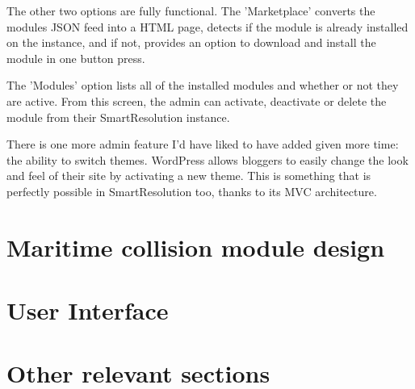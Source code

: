 The other two options are fully functional. The 'Marketplace' converts the modules JSON feed into a HTML page, detects if the module is already installed on the instance, and if not, provides an option to download and install the module in one button press.

The 'Modules' option lists all of the installed modules and whether or not they are active. From this screen, the admin can activate, deactivate or delete the module from their SmartResolution instance.

There is one more admin feature I'd have liked to have added given more time: the ability to switch themes. WordPress allows bloggers to easily change the look and feel of their site by activating a new theme. This is something that is perfectly possible in SmartResolution too, thanks to its MVC architecture.

\section{Maritime collision module design}



\section{User Interface}

\section{Other relevant sections}